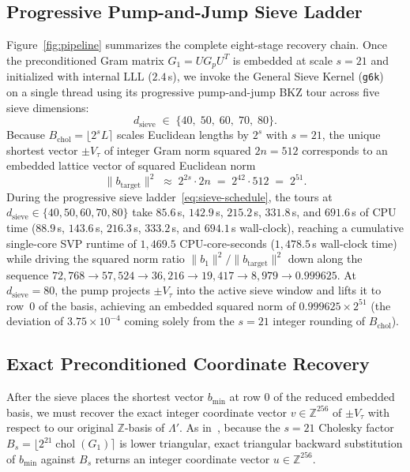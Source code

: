 \documentclass[11pt,a4paper]{article}
\theoremstyle{definition}
\newcommand{\Z}{\mathbb{Z}}
\newcommand{\Lp}{\Lambda'}
\newcommand{\Vt}{V_\tau}
\begin{document}
\subsection{Progressive Pump-and-Jump Sieve Ladder}
Figure~\ref{fig:pipeline} summarizes the complete eight-stage recovery chain. Once the preconditioned Gram matrix $G_1 = U G_p U^T$ is embedded at scale $s=21$ and initialized with internal LLL ($2.4$\,s), we invoke the General Sieve Kernel (\texttt{g6k})~\cite{ADH+19} on a single thread using its progressive pump-and-jump BKZ tour across five sieve dimensions:
\begin{equation}\label{eq:sieve-schedule}
  d_{\mathrm{sieve}} \;\in\; \{40,\; 50,\; 60,\; 70,\; 80\}.
\end{equation}
Because $B_{\mathrm{chol}} = \lfloor 2^s L \rceil$ scales Euclidean lengths by $2^s$ with $s = 21$, the unique shortest vector $\pm\Vt$ of integer Gram norm squared $2n = 512$ corresponds to an embedded lattice vector of squared Euclidean norm
\[
  \|b_{\mathrm{target}}\|^2 \;\approx\; 2^{2s} \cdot 2n \;=\; 2^{42} \cdot 512 \;=\; 2^{51}.
\]
During the progressive sieve ladder~\eqref{eq:sieve-schedule}, the tours at $d_{\mathrm{sieve}} \in \{40, 50, 60, 70, 80\}$ take $85.6$\,s, $142.9$\,s, $215.2$\,s, $331.8$\,s, and $691.6$\,s of CPU time ($88.9$\,s, $143.6$\,s, $216.3$\,s, $333.2$\,s, and $694.1$\,s wall-clock), reaching a cumulative single-core SVP runtime of $1{,}469.5$ CPU-core-seconds ($1{,}478.5$\,s wall-clock time) while driving the squared norm ratio $\|b_1\|^2 / \|b_{\mathrm{target}}\|^2$ down along the sequence $72{,}768 \to 57{,}524 \to 36{,}216 \to 19{,}417 \to 8{,}979 \to 0.999625$. At $d_{\mathrm{sieve}} = 80$, the pump projects $\pm\Vt$ into the active sieve window and lifts it to row~$0$ of the basis, achieving an embedded squared norm of $0.999625 \times 2^{51}$ (the deviation of $3.75 \times 10^{-4}$ coming solely from the $s=21$ integer rounding of $B_{\mathrm{chol}}$).
\subsection{Exact Preconditioned Coordinate Recovery}
After the sieve places the shortest vector $b_{\mathrm{min}}$ at row $0$ of the reduced embedded basis, we must recover the exact integer coordinate vector $v \in \Z^{256}$ of $\pm\Vt$ with respect to our original $\Z$-basis of $\Lp$. As in~\cite{SW26}, because the $s=21$ Cholesky factor $B_s = \lfloor 2^{21}\operatorname{chol}(G_1)\rceil$ is lower triangular, exact triangular backward substitution of $b_{\mathrm{min}}$ against $B_s$ returns an integer coordinate vector $u \in \Z^{256}$.
\end{document}
